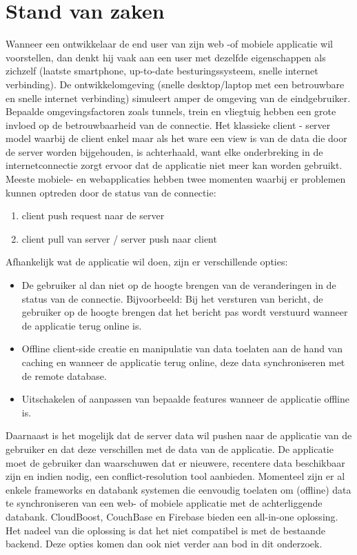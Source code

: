 \section{Stand van zaken}
\label{sec:stand-van-zaken}
Wanneer een ontwikkelaar de end user van zijn web -of mobiele applicatie wil voorstellen, dan denkt hij vaak aan een user met dezelfde eigenschappen als zichzelf (laatste smartphone, up-to-date besturingssysteem,  snelle internet verbinding). De ontwikkelomgeving (snelle desktop/laptop met een betrouwbare en snelle internet verbinding) simuleert amper de omgeving van de eindgebruiker. Bepaalde omgevingsfactoren zoals tunnels, trein en vliegtuig hebben een grote invloed op de betrouwbaarheid van de connectie. Het klassieke client - server model waarbij de client enkel maar als het ware een view is van de data die door de server worden bijgehouden, is achterhaald, want elke onderbreking in de internetconnectie zorgt ervoor dat de applicatie niet meer kan worden gebruikt. Meeste mobiele- en webapplicaties hebben twee momenten waarbij er problemen kunnen optreden door de status van de connectie:
\begin{enumerate}  
\item client push request naar de server
\item client pull van server / server push naar client
\end{enumerate}
Afhankelijk wat de applicatie wil doen, zijn er verschillende opties:
\begin{itemize}  
\item De gebruiker al dan niet op de hoogte brengen van de veranderingen in de status van de connectie. Bijvoorbeeld: Bij het versturen van bericht, de gebruiker op de hoogte brengen dat het bericht pas wordt verstuurd wanneer de applicatie terug online is.
\item Offline client-side creatie en manipulatie van data toelaten aan de hand van caching en wanneer de applicatie terug online, deze data synchroniseren met de remote database.
\item Uitschakelen of aanpassen van bepaalde features wanneer de applicatie offline is.
\end{itemize}
Daarnaast is het mogelijk dat de server data wil pushen naar de applicatie van de gebruiker en dat deze verschillen met de data van de applicatie. De applicatie moet de gebruiker dan waarschuwen dat er nieuwere, recentere data beschikbaar zijn en indien nodig, een conflict-resolution tool aanbieden.
Momenteel zijn er al enkele frameworks en databank systemen die eenvoudig toelaten om (offline) data te synchroniseren van een web- of mobiele applicatie met de achterliggende databank. CloudBoost, CouchBase en Firebase bieden een all-in-one oplossing. Het nadeel van die oplossing is dat het niet compatibel is met de bestaande backend. Deze opties komen dan ook niet verder aan bod in dit  onderzoek.
